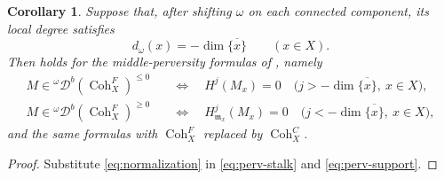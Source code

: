 \documentclass[11pt]{amsart}
\newcommand{\Coh}{\operatorname{{Coh}}}
\newcommand{\Db}{\mathcal D^b}
\theoremstyle{plain}
\newtheorem{corollary}[corollary]{Corollary}
\theoremstyle{definition}
\numberwithin{equation}{section}
\begin{document}
\begin{corollary}\label{cor:middle}
Suppose that, after shifting $\omega$ on each connected component, its local degree satisfies
\begin{equation}\label{eq:normalization}
 d_\omega(x)=-\dim\overline{\{x\}}\qquad(x\in X).
\end{equation}
Then  holds for the middle-perversity formulas of \cite[Definition 5.2.1]{Bau}, namely
\begin{align}
 M\in{}^{\omega}\Db(\Coh^F_X)^{\leq0}
 &\quad\Longleftrightarrow\quad H^j(M_x)=0
               \quad\bigl(j>-\dim\overline{\{x\}},\ x\in X\bigr),\label{eq:middle-stalk}\\
 M\in{}^{\omega}\Db(\Coh^F_X)^{\geq0}
 &\quad\Longleftrightarrow\quad
 H^j_{\mathfrak m_x}(M_x)=0
               \quad\bigl(j<-\dim\overline{\{x\}},\ x\in X\bigr),\label{eq:middle-support}
\end{align}
and the same formulas with $\Coh^F_X$ replaced by $\Coh^C_X$.
\end{corollary}
\begin{proof}
Substitute \eqref{eq:normalization} in \eqref{eq:perv-stalk} and \eqref{eq:perv-support}.
\end{proof}
\end{document}
